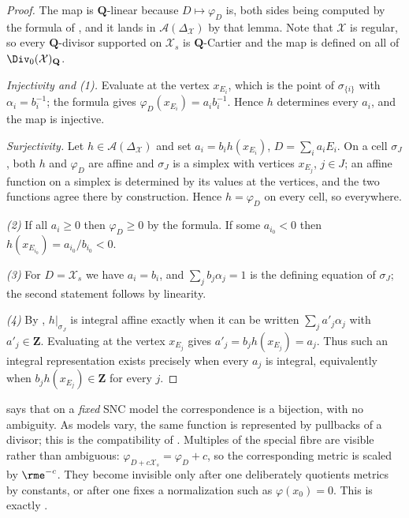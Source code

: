 \begin{proof}
The map is $\mathbf Q$-linear because $D\mapsto\varphi_D$ is, both sides
being computed by the formula of , and it
lands in $\mathcal A(\Delta_{\mathcal X})$ by that lemma. Note that
$\mathcal X$ is regular, so every $\mathbf Q$-divisor supported on
$\mathcal X_s$ is $\mathbf Q$-Cartier and the map is defined on all of
$\Div_0(\mathcal X)_{\mathbf Q}$.

\emph{Injectivity and (1).} Evaluate at the vertex $x_{E_i}$, which is
the point of $\sigma_{\{i\}}$ with $\alpha_i=b_i^{-1}$; the formula
gives $\varphi_D(x_{E_i})=a_ib_i^{-1}$. Hence $h$ determines every
$a_i$, and the map is injective.

\emph{Surjectivity.} Let $h\in\mathcal A(\Delta_{\mathcal X})$ and set
$a_i=b_ih(x_{E_i})$, $D=\sum_ia_iE_i$. On a cell $\sigma_J$, both
$h$ and $\varphi_D$ are affine and $\sigma_J$ is a simplex with
vertices $x_{E_j}$, $j\in J$; an affine function on a simplex is
determined by its values at the vertices, and the two functions agree there
by construction. Hence $h=\varphi_D$ on every cell, so everywhere.

\emph{(2)} If all $a_i\ge0$ then $\varphi_D\ge0$ by the formula. If some
$a_{i_0}<0$ then $h(x_{E_{i_0}})=a_{i_0}/b_{i_0}<0$.

\emph{(3)} For $D=\mathcal X_s$ we have $a_i=b_i$, and
$\sum_jb_j\alpha_j=1$ is the defining equation of $\sigma_J$; the second
statement follows by linearity.

\emph{(4)} By , $h|_{\sigma_J}$ is integral
affine exactly when it can be written $\sum_ja'_j\alpha_j$ with
$a'_j\in\mathbf Z$.  Evaluating at the vertex $x_{E_j}$ gives
$a'_j=b_jh(x_{E_j})=a_j$.  Thus such an integral representation exists
precisely when every $a_j$ is integral, equivalently when
$b_jh(x_{E_j})\in\mathbf Z$ for every $j$.
\end{proof}

\begin{remark}
\label{rem:model-function-ambiguity}
 says that on a \emph{fixed} SNC
model the correspondence is a bijection, with no ambiguity.  As models vary,
the same function is represented by pullbacks of a divisor; this is the
compatibility of .  Multiples of the
special fibre are visible rather than ambiguous:
$\varphi_{D+c\mathcal X_s}=\varphi_D+c$, so the corresponding metric is
scaled by $\rme^{-c}$.  They become invisible only after one deliberately
quotients metrics by constants, or after one fixes a normalization such as
$\varphi(x_0)=0$.  This is exactly
.
\end{remark}

